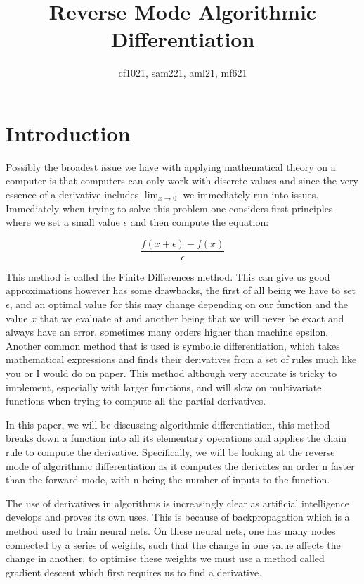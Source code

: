 \documentclass{article}
\title{Reverse Mode Algorithmic Differentiation}
\author{cf1021, sam221, aml21, mf621}
\date{}
\begin{document}
\maketitle
\tableofcontents
\newpage
\section{Introduction}

Possibly the broadest issue we have with applying mathematical theory on a computer is that computers can only work with discrete values and since the very essence of a derivative includes $\lim_{x \to 0}$ we immediately run into issues. Immediately when trying to solve this problem one considers first principles where we set a small value $\epsilon$ and then compute the equation:

\begin{equation*}
    \frac{f(x+\epsilon) - f(x)}{\epsilon}
\end{equation*}

This method is called the Finite Differences method. This can give us good approximations however has some drawbacks, the first of all being we have to set $\epsilon$, and an optimal value for this may change depending on our function and the value $x$ that we evaluate at and another being that we will never be exact and always have an error, sometimes many orders higher than machine epsilon. Another common method that is used is symbolic differentiation, which takes mathematical expressions and finds their derivatives from a set of rules much like you or I would do on paper. This method although very accurate is tricky to implement, especially with larger functions, and will slow on multivariate functions when trying to compute all the partial derivatives.

In this paper, we will be discussing algorithmic differentiation, this method breaks down a function into all its elementary operations and applies the chain rule to compute the derivative. Specifically, we will be looking at the reverse mode of algorithmic differentiation as it computes the derivates an order n faster than the forward mode, with n being the number of inputs to the function.

The use of derivatives in algorithms is increasingly clear as artificial intelligence develops and proves its own uses. This is because of backpropagation which is a method used to train neural nets. On these neural nets, one has many nodes connected by a series of weights, such that the change in one value affects the change in another, to optimise these weights we must use a method called gradient descent which first requires us to find a derivative.
\end{document}
